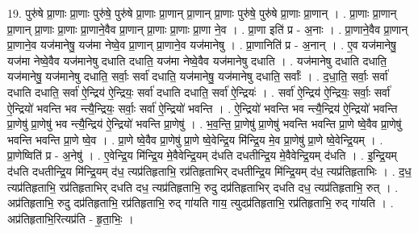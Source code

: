 \documentclass[17pt]{extarticle}
\begin{document}
19. पुरु॑षे प्रा॒णाः प्रा॒णाः पुरु॑षे॒ पुरु॑षे प्रा॒णाः प्रा॒णान् प्रा॒णान् प्रा॒णाः पुरु॑षे॒ पुरु॑षे प्रा॒णाः प्रा॒णान् । . प्रा॒णाः प्रा॒णान् प्रा॒णान् प्रा॒णाः प्रा॒णाः प्रा॒णाने॒वैव प्रा॒णान् प्रा॒णाः प्रा॒णाः प्रा॒णा ने॒व । . प्रा॒णा इति॑ प्र - अ॒नाः । . प्रा॒णाने॒वैव प्रा॒णान् प्रा॒णाने॒व यज॑मानेषु॒ यज॑मा नेष्वे॒व प्रा॒णान् प्रा॒णाने॒व यज॑मानेषु । . प्रा॒णानिति॑ प्र - अ॒नान् । . ए॒व यज॑मानेषु॒ यज॑मा नेष्वे॒वैव यज॑मानेषु दधाति दधाति॒ यज॑मा नेष्वे॒वैव यज॑मानेषु दधाति । . यज॑मानेषु दधाति दधाति॒ यज॑मानेषु॒ यज॑मानेषु दधाति॒ सर्वाः॒ सर्वा॑ दधाति॒ यज॑मानेषु॒ यज॑मानेषु दधाति॒ सर्वाः᳚ । . द॒धा॒ति॒ सर्वाः॒ सर्वा॑ दधाति दधाति॒ सर्वा॑ ऐ॒न्द्रिय॑ ऐ॒न्द्रियः॒ सर्वा॑ दधाति दधाति॒ सर्वा॑ ऐ॒न्द्रियः॑ । . सर्वा॑ ऐ॒न्द्रिय॑ ऐ॒न्द्रियः॒ सर्वाः॒ सर्वा॑ ऐ॒न्द्रियो॑ भवन्ति भव न्त्यै॒न्द्रियः॒ सर्वाः॒ सर्वा॑ ऐ॒न्द्रियो॑ भवन्ति । . ऐ॒न्द्रियो॑ भवन्ति भव न्त्यै॒न्द्रिय॑ ऐ॒न्द्रियो॑ भवन्ति प्रा॒णेषु॑ प्रा॒णेषु॑ भव न्त्यै॒न्द्रिय॑ ऐ॒न्द्रियो॑ भवन्ति प्रा॒णेषु॑ । . भ॒व॒न्ति॒ प्रा॒णेषु॑ प्रा॒णेषु॑ भवन्ति भवन्ति प्रा॒णे ष्वे॒वैव प्रा॒णेषु॑ भवन्ति भवन्ति प्रा॒णे ष्वे॒व । . प्रा॒णे ष्वे॒वैव प्रा॒णेषु॑ प्रा॒णे ष्वे॒वेन्द्रि॒य मि॑न्द्रि॒य मे॒व प्रा॒णेषु॑ प्रा॒णे ष्वे॒वेन्द्रि॒यम् । . प्रा॒णेष्विति॑ प्र - अ॒नेषु॑ । . ए॒वेन्द्रि॒य मि॑न्द्रि॒य मे॒वैवेन्द्रि॒यम् द॑धति दधतीन्द्रि॒य मे॒वैवेन्द्रि॒यम् द॑धति । . इ॒न्द्रि॒यम् द॑धति दधतीन्द्रि॒य मि॑न्द्रि॒यम् द॑ध॒ त्यप्र॑तिहृताभि॒ रप्र॑तिहृताभिर् दधतीन्द्रि॒य मि॑न्द्रि॒यम् द॑ध॒ त्यप्र॑तिहृताभिः । . द॒ध॒ त्यप्र॑तिहृताभि॒ रप्र॑तिहृताभिर् दधति दध॒ त्यप्र॑तिहृताभि॒ रुदु दप्र॑तिहृताभिर् दधति दध॒ त्यप्र॑तिहृताभि॒ रुत् । . अप्र॑तिहृताभि॒ रुदु दप्र॑तिहृताभि॒ रप्र॑तिहृताभि॒ रुद् गा॑यति गाय॒ त्युदप्र॑तिहृताभि॒ रप्र॑तिहृताभि॒ रुद् गा॑यति । . अप्र॑तिहृताभि॒रित्यप्र॑ति - हृ॒ता॒भिः॒ । \newline
\end{document}
